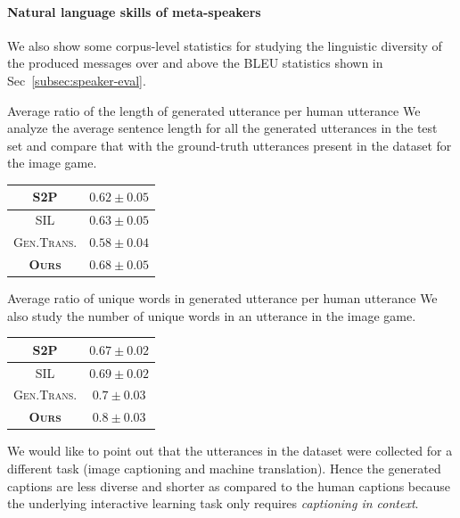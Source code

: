 \documentclass{article}
\newcommand{\stp}{\textsc{S2P\xspace}}
\newcommand{\gentrans}{\textsc{Gen.Trans.\xspace}}
\newcommand{\sil}{\textsc{SIL\xspace}}
\begin{document}
\paragraph{Natural language skills of meta-speakers}
We also show some corpus-level statistics for studying the linguistic diversity of the produced messages over and above the BLEU statistics shown in Sec~\ref{subsec:speaker-eval}.

\begin{itemize}
\begin{minipage}{0.6\textwidth}
\item Average ratio of the length of generated utterance per human utterance
We analyze the average sentence length for all the generated utterances in the test set and compare that with the ground-truth utterances present in the dataset for the image game.
\end{minipage}
\begin{minipage}{0.3\textwidth}
  \centering
  \small
  \begin{tabular}{|c|c|}
       \hline
       \stp & $0.62 \pm 0.05$ \\
       \hline
       \sil & $0.63 \pm 0.05$ \\
       \hline
       \gentrans & $0.58 \pm 0.04$ \\
       \hline
       \textbf{\textsc{Ours}} & $0.68 \pm 0.05$ \\
       \hline
  \end{tabular}
  \label{tab:spk-length}
\end{minipage}

\begin{minipage}{0.6\textwidth}
\item Average ratio of unique words in generated utterance per human utterance
We also study the number of unique words in an utterance in the image game.
\end{minipage}
\begin{minipage}{0.3\textwidth}
  \centering
  \small
  \begin{tabular}{|c|c|}
       \hline
       \stp & $0.67 \pm 0.02$ \\
       \hline
       \sil & $0.69 \pm 0.02$ \\
       \hline
       \gentrans & $0.7 \pm 0.03$ \\
       \hline
       \textbf{\textsc{Ours}} & $0.8 \pm 0.03$ \\
       \hline
  \end{tabular}
  \label{tab:spk-words}
\end{minipage}
\end{itemize}
We would like to point out that the utterances in the dataset were collected for a different task (image captioning and machine translation). Hence the generated captions are less diverse and shorter as compared to the human captions because the underlying interactive learning task only requires \emph{captioning in context}.
\end{document}
